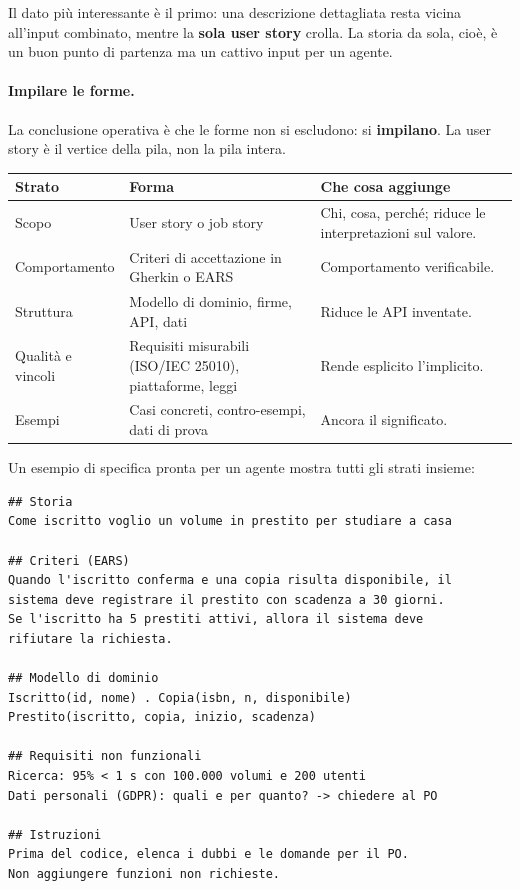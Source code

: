 \documentclass[12pt]{extarticle}
\begin{document}
\noindent Il dato più interessante è il primo: una descrizione dettagliata resta vicina all'input combinato, mentre la \textbf{sola user story} crolla. La storia da sola, cioè, è un buon punto di partenza ma un cattivo input per un agente.

\paragraph{Impilare le forme.}
La conclusione operativa è che le forme non si escludono: si \textbf{impilano}. La user story è il vertice della pila, non la pila intera.

\begin{center}
\small
\begin{tabular}{p{3.6cm}p{6.2cm}p{5.4cm}}
    \toprule
    \textbf{Strato} & \textbf{Forma} & \textbf{Che cosa aggiunge} \\
    \midrule
    Scopo & User story o job story & Chi, cosa, perché; riduce le interpretazioni sul valore. \\
    \addlinespace
    Comportamento & Criteri di accettazione in Gherkin o EARS & Comportamento verificabile. \\
    \addlinespace
    Struttura & Modello di dominio, firme, API, dati & Riduce le API inventate. \\
    \addlinespace
    Qualità e vincoli & Requisiti misurabili (ISO/IEC 25010), piattaforme, leggi & Rende esplicito l'implicito. \\
    \addlinespace
    Esempi & Casi concreti, contro-esempi, dati di prova & Ancora il significato. \\
    \bottomrule
\end{tabular}
\end{center}

\noindent Un esempio di specifica pronta per un agente mostra tutti gli strati insieme:

\begin{lstlisting}
## Storia
Come iscritto voglio un volume in prestito per studiare a casa

## Criteri (EARS)
Quando l'iscritto conferma e una copia risulta disponibile, il
sistema deve registrare il prestito con scadenza a 30 giorni.
Se l'iscritto ha 5 prestiti attivi, allora il sistema deve
rifiutare la richiesta.

## Modello di dominio
Iscritto(id, nome) . Copia(isbn, n, disponibile)
Prestito(iscritto, copia, inizio, scadenza)

## Requisiti non funzionali
Ricerca: 95% < 1 s con 100.000 volumi e 200 utenti
Dati personali (GDPR): quali e per quanto? -> chiedere al PO

## Istruzioni
Prima del codice, elenca i dubbi e le domande per il PO.
Non aggiungere funzioni non richieste.
\end{lstlisting}
\end{document}
